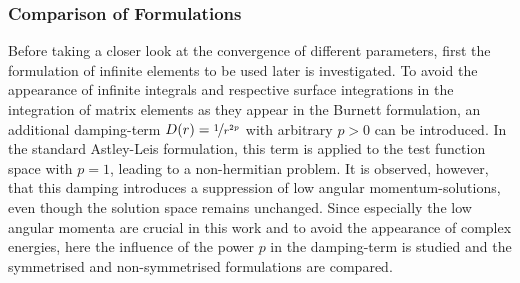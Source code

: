 \subsubsection{Comparison of Formulations}
\label{ch:bmFormul}
Before taking a closer look at the convergence of different parameters, first the formulation of infinite elements to be used later is investigated.
To avoid the appearance of infinite integrals and respective surface integrations in the integration of matrix elements as they appear in the Burnett formulation, an additional damping-term $D(r)=\nicefrac{1}{r^{2p}}$ with arbitrary $p>0$ can be introduced.
In the standard Astley-Leis formulation, this term is applied to the test function space with $p=1$, leading to a non-hermitian problem.
It is observed, however, that this damping introduces a suppression of low angular momentum-solutions, even though the solution space remains unchanged.
Since especially the low angular momenta are crucial in this work and to avoid the appearance of complex energies, here the influence of the power $p$ in the damping-term is studied and the symmetrised and non-symmetrised formulations are compared.

